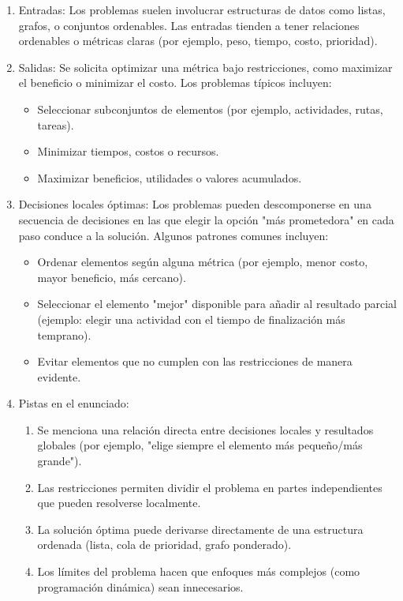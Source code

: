 \begin{enumerate}  
  \item Entradas:  
  Los problemas suelen involucrar estructuras de datos como listas, grafos, o conjuntos ordenables. Las entradas tienden a tener relaciones ordenables o métricas claras (por ejemplo, peso, tiempo, costo, prioridad).  

  \item Salidas:  
  Se solicita optimizar una métrica bajo restricciones, como maximizar el beneficio o minimizar el costo. Los problemas típicos incluyen:  
  \begin{itemize}  
    \item Seleccionar subconjuntos de elementos (por ejemplo, actividades, rutas, tareas).  
    \item Minimizar tiempos, costos o recursos.  
    \item Maximizar beneficios, utilidades o valores acumulados.  
  \end{itemize}  

  \item Decisiones locales óptimas:  
  Los problemas pueden descomponerse en una secuencia de decisiones en las que elegir la opción "más prometedora" en cada paso conduce a la solución. Algunos patrones comunes incluyen:  
  \begin{itemize}  
    \item Ordenar elementos según alguna métrica (por ejemplo, menor costo, mayor beneficio, más cercano).  
    \item Seleccionar el elemento "mejor" disponible para añadir al resultado parcial (ejemplo: elegir una actividad con el tiempo de finalización más temprano).  
    \item Evitar elementos que no cumplen con las restricciones de manera evidente.  
  \end{itemize}  

  \item Pistas en el enunciado:  
  \begin{enumerate}  
    \item Se menciona una relación directa entre decisiones locales y resultados globales (por ejemplo, "elige siempre el elemento más pequeño/más grande").  
    \item Las restricciones permiten dividir el problema en partes independientes que pueden resolverse localmente.  
    \item La solución óptima puede derivarse directamente de una estructura ordenada (lista, cola de prioridad, grafo ponderado).  
    \item Los límites del problema hacen que enfoques más complejos (como programación dinámica) sean innecesarios.  
  \end{enumerate}  
\end{enumerate}  

